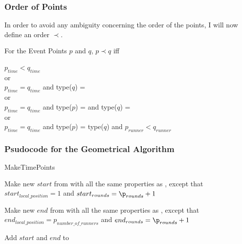 \subsubsection{Order of Points}
\label{order}
In order to avoid any ambiguity concerning the order of the points, I will now define an order $\prec$. 

\begin{defi}
For the Event Points $p$ and $q$, $p \prec q$ iff
\begin{center}
\label{orderOfPoints}
$p_{time} < q_{time}$\\
or \\
$p_{time} = q_{time}$ and type($q$) = \comFin\\
or \\
$p_{time} = q_{time}$ and type($p$) = \comStart and type($q$) = \comEnd \\
or \\
$p_{time} = q_{time}$ and type($p$) = type($q$) and $p_{runner} < q_{runner}$
\end{center}
\end{defi}

\subsubsection{Psudocode for the Geometrical Algorithm}

\begin{algorithm}[H]
\caption{MakeTimePoints}
\highlights
{}
 
Make new \startT $start$ from \p with all the same properties as \p, except that $start_{local\_position} = 1$ and $start_{rounds} = \p_{rounds} + 1$
  
Make new \eT $end$ from \p with all the same properties as \p, except that $end_{local\_position} = p_{number\_of\_runners}$ and $end_{rounds} = \p_{rounds} + 1$
    
Add $start$ and $end$ to \li

\return \li
\end{algorithm}

